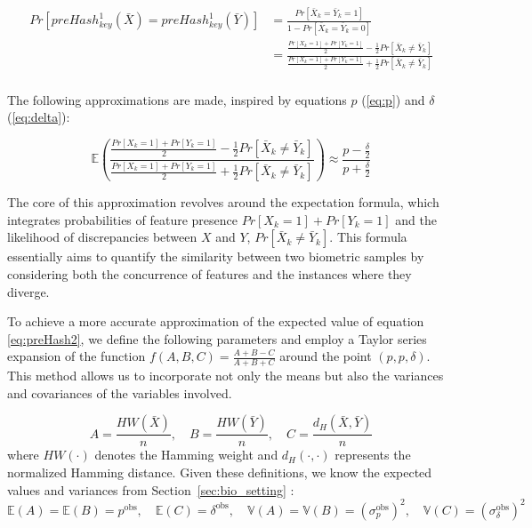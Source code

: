 \begin{equation} \label{eq:preHash2}
    \begin{aligned}
        Pr[preHash_{key}^1(\bar{X}) = preHash_{key}^1(\bar{Y})] &= \frac{Pr[\bar{X}_k = \bar{Y}_k = 1]}{1 - Pr[\bar{X}_k = \bar{Y}_k = 0]}\\
        &= \frac{\frac{Pr[X_k = 1] + Pr[Y_k = 1]}{2} - \frac{1}{2}Pr[\bar{X}_k \neq \bar{Y}_k]}{\frac{Pr[X_k = 1] + Pr[Y_k = 1]}{2} + \frac{1}{2}Pr[\bar{X}_k \neq \bar{Y}_k]}\\
    \end{aligned}
\end{equation}

The following approximations are made, inspired by equations \(p\) (\ref{eq:p}) and $\delta$ (\ref{eq:delta}):

\begin{equation}
    \mathbb{E}\left(\frac{\frac{Pr[X_k = 1] + Pr[Y_k = 1]}{2} - \frac{1}{2}Pr[\bar{X}_k \neq \bar{Y}_k]}{\frac{Pr[X_k = 1] + Pr[Y_k = 1]}{2} + \frac{1}{2}Pr[\bar{X}_k \neq \bar{Y}_k]}\right) \approx \frac{p - \frac{\delta}{2}}{p + \frac{\delta}{2}}
\end{equation}

The core of this approximation revolves around the expectation formula, which integrates probabilities of feature presence \(Pr[X_k=1]+Pr[Y_k=1]\) and the likelihood of discrepancies between \(X\) and \(Y\), \(Pr[\bar{X}_k \neq \bar{Y}_k]\). This formula essentially aims to quantify the similarity between two biometric samples by considering both the concurrence of features and the instances where they diverge.

To achieve a more accurate approximation of the expected value of equation \ref{eq:preHash2}, we define the following parameters and employ a Taylor series expansion of the function \(f(A,B,C) = \frac{A + B - C}{A + B + C}\) around the point \((p, p, \delta)\). This method allows us to incorporate not only the means but also the variances and covariances of the variables involved.

\[
A = \frac{HW(\bar{X})}{n}, \quad B = \frac{HW(\bar{Y})}{n}, \quad C = \frac{d_H(\bar{X}, \bar{Y})}{n}
\]
where \(HW(\cdot)\) denotes the Hamming weight and \(d_H(\cdot, \cdot)\) represents the normalized Hamming distance. Given these definitions, we know the expected values and variances from Section~\ref{sec:bio_setting} :
\[
    \mathbb{E}(A) = \mathbb{E}(B) = p^\text{obs}, \quad \mathbb{E}(C) = \delta^\text{obs}, \quad \mathbb{V}(A) = \mathbb{V}(B) = ({\sigma^\text{obs}_p})^2, \quad \mathbb{V}(C) = ({\sigma^\text{obs}_\delta})^2
\]

